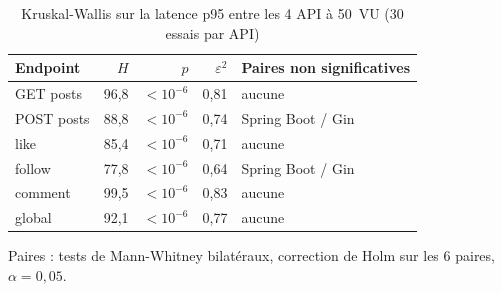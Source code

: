 \begin{table}[htbp]
\centering
\small
\caption{Kruskal-Wallis sur la latence p95 entre les 4 API à 50~VU (30 essais par API)}
\label{tab:kruskal}
\begin{tabular}{lrrrp{4.2cm}}
\toprule
Endpoint & $H$ & $p$ & $\varepsilon^2$ & Paires non significatives \\
\midrule
GET posts & 96,8 & $<10^{-6}$ & 0,81 & aucune \\
POST posts & 88,8 & $<10^{-6}$ & 0,74 & Spring Boot / Gin \\
like & 85,4 & $<10^{-6}$ & 0,71 & aucune \\
follow & 77,8 & $<10^{-6}$ & 0,64 & Spring Boot / Gin \\
comment & 99,5 & $<10^{-6}$ & 0,83 & aucune \\
global & 92,1 & $<10^{-6}$ & 0,77 & aucune \\
\bottomrule
\end{tabular}
\par\smallskip\footnotesize Paires : tests de Mann-Whitney bilatéraux, correction de Holm sur les 6 paires, $\alpha = 0{,}05$.
\end{table}
